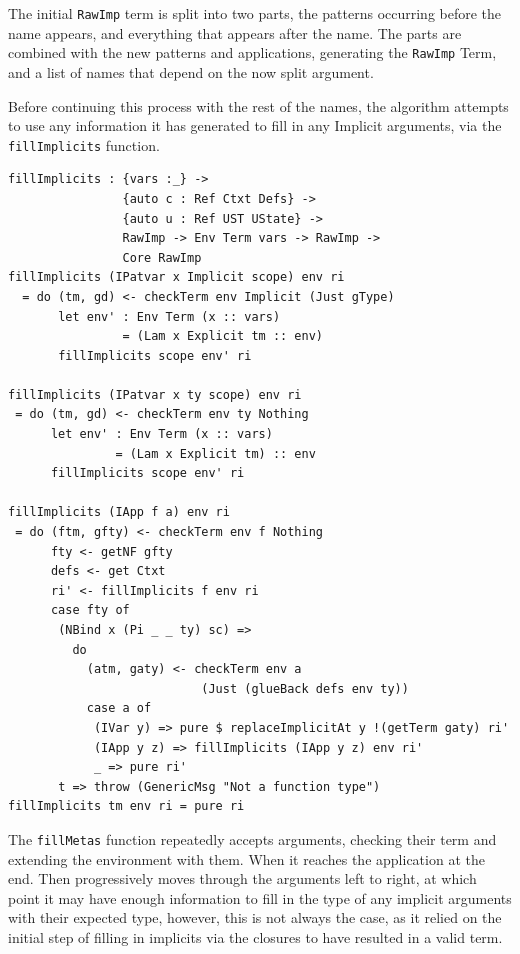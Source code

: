 \documentclass[a4paper]{article}
\begin{document}
The initial \texttt{RawImp} term is split into two parts, the
patterns occurring before the name appears, and everything that
appears after the name. The parts are combined with the new patterns
and applications, generating the \texttt{RawImp} Term,
and a list of names that depend on the now split argument.

Before continuing this process with the rest of the names,
the algorithm attempts to use any information it has generated
to fill in any Implicit arguments, via the \texttt{fillImplicits} function.

\begin{center}
  \begin{verbatim}
fillImplicits : {vars :_} ->
                {auto c : Ref Ctxt Defs} -> 
                {auto u : Ref UST UState} ->
                RawImp -> Env Term vars -> RawImp -> 
                Core RawImp 
fillImplicits (IPatvar x Implicit scope) env ri
  = do (tm, gd) <- checkTerm env Implicit (Just gType)
       let env' : Env Term (x :: vars)
                = (Lam x Explicit tm :: env)
       fillImplicits scope env' ri
       
fillImplicits (IPatvar x ty scope) env ri
 = do (tm, gd) <- checkTerm env ty Nothing
      let env' : Env Term (x :: vars) 
               = (Lam x Explicit tm) :: env
      fillImplicits scope env' ri

fillImplicits (IApp f a) env ri
 = do (ftm, gfty) <- checkTerm env f Nothing
      fty <- getNF gfty
      defs <- get Ctxt
      ri' <- fillImplicits f env ri
      case fty of
       (NBind x (Pi _ _ ty) sc) => 
         do
           (atm, gaty) <- checkTerm env a
                           (Just (glueBack defs env ty))                    
           case a of 
            (IVar y) => pure $ replaceImplicitAt y !(getTerm gaty) ri'
            (IApp y z) => fillImplicits (IApp y z) env ri'
            _ => pure ri'
       t => throw (GenericMsg "Not a function type")
fillImplicits tm env ri = pure ri
  \end{verbatim}
\end{center}

The \texttt{fillMetas} function repeatedly accepts arguments,
checking their term and extending the environment with them.
When it reaches the application at the end. Then progressively
moves through the arguments left to right, at which point it
may have enough information to fill in the type of any implicit
arguments with their expected type, however, this is not always
the case, as it relied on the initial step of filling in implicits
via the closures to have resulted in a valid term.
\end{document}
